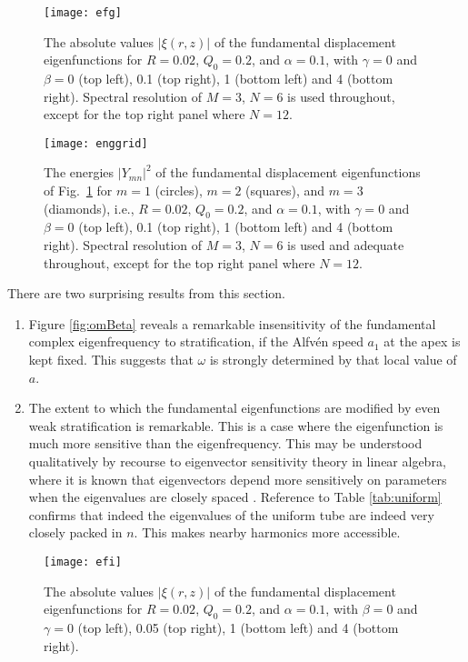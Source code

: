 \documentclass[12pt]{iopart}
\begin{document}
{\begin{figure}[tbhp]
\begin{center}
\texttt{[image: efg]}
\caption{The absolute values $|\xi(r,z)|$ of the fundamental displacement eigenfunctions for $R=0.02$, $Q_0=0.2$, and $\alpha=0.1$, with $\gamma=0$ and $\beta=0$ (top left), 0.1 (top right), 1 (bottom left) and 4 (bottom right). Spectral resolution of $M=3$, $N=6$ is used throughout, except for the top right panel where $N=12$.}
\label{fig:efg}
\end{center}
\end{figure}

\begin{figure}[tbhp]
\begin{center}
\texttt{[image: enggrid]}
\caption{The energies $|Y_{mn}|^2$ of the fundamental displacement eigenfunctions of Fig.~\ref{fig:efg} for $m=1$ (circles), $m=2$ (squares), and $m=3$ (diamonds), i.e., $R=0.02$, $Q_0=0.2$, and $\alpha=0.1$, with $\gamma=0$ and $\beta=0$ (top left), 0.1 (top right), 1 (bottom left) and 4 (bottom right). Spectral resolution of $M=3$, $N=6$ is used and adequate throughout, except for the top right panel where $N=12$.}
\label{fig:eng}
\end{center}
\end{figure}



There are two surprising results from this section.
\begin{enumerate}
\item Figure \ref{fig:omBeta} reveals a remarkable insensitivity of the fundamental complex eigenfrequency to stratification, if the Alfv\'en speed $a_1$ at the apex is kept fixed. This suggests that $\omega$ is strongly determined by that local value of $a$.
\item The extent to which the fundamental eigenfunctions are modified by even weak stratification is remarkable. This is a case where the eigenfunction is much more sensitive than the eigenfrequency. This may be understood qualitatively by recourse to eigenvector sensitivity theory in linear algebra, where it is known that eigenvectors depend more sensitively on parameters when the eigenvalues are closely spaced \cite{Golvan96aa}. Reference to Table \ref{tab:uniform} confirms that indeed the eigenvalues of the uniform tube are indeed very closely packed in $n$. This makes nearby harmonics more accessible.
\end{enumerate}

\begin{figure}[tbhp]
\begin{center}
\texttt{[image: efi]}
\caption{The absolute values $|\xi(r,z)|$ of the fundamental displacement eigenfunctions for $R=0.02$, $Q_0=0.2$, and $\alpha=0.1$, with $\beta=0$ and $\gamma=0$ (top left), 0.05 (top right), 1 (bottom left) and 4 (bottom right). }
\label{fig:efi}
\end{center}
\end{figure}

}
\end{document}
